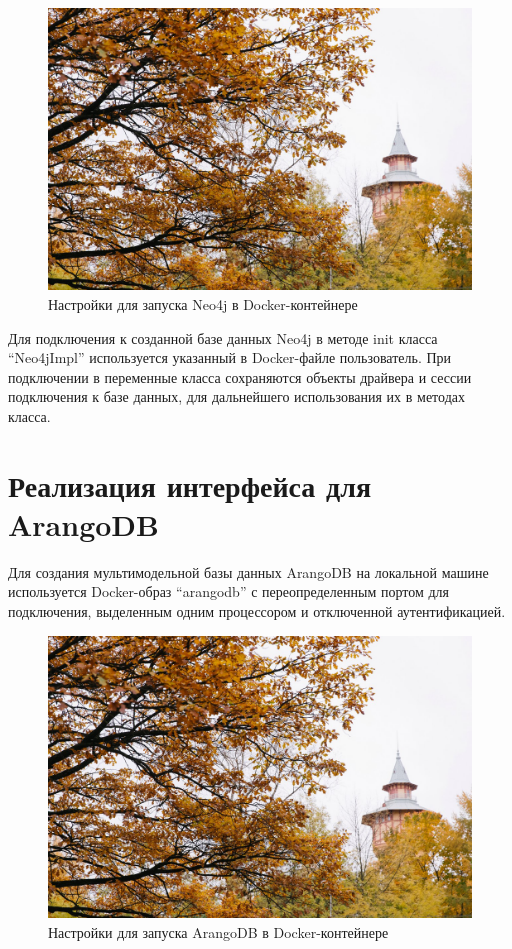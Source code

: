 \begin{figure}[ht!]
    \center
    \includegraphics [scale=0.27] {my_folder/images//spbpu_hydrotower}
    \caption{Настройки для запуска Neo4j в Docker-контейнере}
\end{figure}

Для подключения к созданной базе данных Neo4j в методе init класса “Neo4jImpl” используется указанный в Docker-файле пользователь. При подключении в переменные класса сохраняются объекты драйвера и сессии подключения к базе данных, для дальнейшего использования их в методах класса.


\section{Реализация интерфейса для ArangoDB}

Для создания мультимодельной базы данных ArangoDB на локальной машине используется Docker-образ “arangodb” с переопределенным портом для подключения, выделенным одним процессором и отключенной аутентификацией.

\begin{figure}[ht!]
    \center
    \includegraphics [scale=0.27] {my_folder/images//spbpu_hydrotower}
    \caption{Настройки для запуска ArangoDB в Docker-контейнере}
\end{figure}

